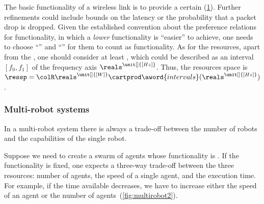 \begin{example}
    The basic functionality of a wireless link is to provide a certain  (\cref{fig:networklink}).
    Further refinements could include bounds on the latency or the probability that a packet drop is dropped.
    Given the established convention about the preference relations for functionality, in which a \emph{lower} functionality is ``easier''
    to achieve, one needs to choose ``'' and ``'' for them to count as functionality.
    As for the resources, apart from the , one should consider at least , which could be described as an interval~$[f_0,f_1]$ of the frequency axis $\reals^{\unit[]{[Hz]}}$.
    Thus, the resources space is $\ressp=\colR\reals^{\unit[]{[W]}}\cartprod\aword{intervals}(\reals^{\unit[]{[Hz]}})$.
\end{example}
\begin{figure}[h!]
    \centering
    \caption{ }
    \label{fig:networklink}
\end{figure}

\subsubsection{Multi-robot systems}

In a multi-robot system there is always a trade-off between the number of robots and the capabilities of the single robot.
\begin{example}
    Suppose we need to create a swarm of agents whose functionality is
    .
    If the functionality is fixed, one expects a three-way trade-off between the three resources: number of agents, the speed of a single agent, and the execution time.
    For example, if the time available decreases, we have to increase either the speed of an agent or the number of agents~(\cref{fig:multirobot2}).
\end{example}

\begin{figure}[h!]
    \\
    \caption{}
\end{figure}


